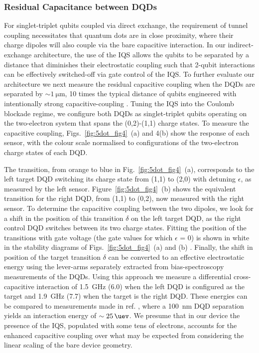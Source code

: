 \subsubsection{Residual Capacitance between DQDs}
For singlet-triplet qubits coupled via direct exchange, the requirement of tunnel coupling necessitates that quantum dots are in close proximity, where their charge dipoles will also couple via the bare capacitive interaction. In our indirect-exchange architecture, the use of the IQS allows the qubits to be separated by a distance that diminishes their electrostatic coupling such that 2-qubit interactions can be effectively switched-off via gate control of the IQS. To further evaluate our architecture we next measure the residual capacitive coupling when the DQDs are separated by $\sim \SI{1}{\micro\meter}$, 10 times the typical distance of qubits engineered with intentionally strong capacitive-coupling \cite{weperen,Shulman202}. Tuning the IQS into the Coulomb blockade regime, we configure both DQDs as singlet-triplet qubits operating on the two-electron system that spans the (0,2)-(1,1) charge states. To measure the capacitive coupling, Figs.~\ref{fig:5dot_fig4}~(a) and 4(b) show the response of each sensor, with the colour scale normalised to configurations of the two-electron charge states of each DQD.

The transition, from orange to blue in Fig.~\ref{fig:5dot_fig4}~(a), corresponds to the left target DQD switching its charge state from (1,1) to (2,0) with detuning $\epsilon$, as measured by the left sensor. Figure~\ref{fig:5dot_fig4}~(b) shows the equivalent transition for the right DQD, from (1,1) to (0,2), now measured with the right sensor. To determine the capacitive coupling between the two dipoles, we look for a shift in the position of this transition $\delta$ on the left target DQD, as the right control DQD switches between its two charge states. Fitting the position of the transitions with gate voltage (the gate values for which $\epsilon$ = 0) is shown in white in the stability diagrams of Figs.~\ref{fig:5dot_fig4}~(a) and (b) \cite{dicarlo}. Finally, the shift in position of the target transition $\delta$ can be converted to an effective electrostatic energy using the lever-arms separately extracted from bias-spectroscopy measurements of the DQDs. Using this approach we measure a differential cross-capacitive interaction of \SI{1.5}{\giga\hertz} (\SI{6.0}{\uev})  when the left DQD is configured as the target and  \SI{1.9}{\giga\hertz} (\SI{7.7}{\uev}) when the target is the right DQD. These energies can be compared to measurements made in ref. \cite{weperen}, where a \SI{100}{\nano\meter} DQD separation yields an interaction energy of $\sim \SI{25}{\uev}$.  We presume that in our device the presence of the IQS, populated with some tens of electrons, accounts for the enhanced capacitive coupling over what may be expected from considering the linear scaling of the bare device geometry. 


